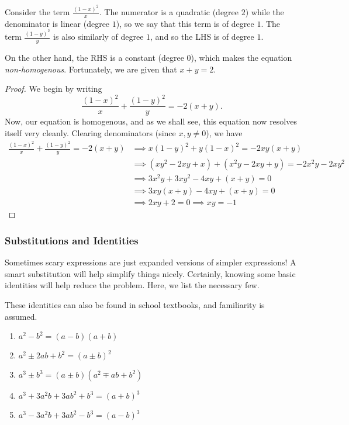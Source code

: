\documentclass[../jarvis.tex]{subfiles}
\begin{document}
Consider the term $\frac{(1-x)^2}{x}$. The numerator is a quadratic (degree $2$) while the denominator is linear (degree $1$), so we say that this term is of degree $1$. The term $\frac{(1-y)^2}{y}$ is also similarly of degree $1$, and so the LHS is of degree $1$. 

On the other hand, the RHS is a constant (degree $0$), which makes the equation \textit{non-homogenous}. Fortunately, we are given that $x+y=2$. 

\begin{proof}
    We begin by writing
$$\frac{(1-x)^2}{x}+\frac{(1-y)^2}{y}=-2(x+y).$$ Now, our equation is homogenous, and as we shall see, this equation now resolves itself very cleanly. Clearing denominators (since $x,y \neq 0$), we have
\begin{align*}
    \frac{(1-x)^2}{x}+\frac{(1-y)^2}{y}=-2(x+y) &\implies x(1-y)^2+y(1-x)^2=-2xy(x+y) \\
    &\implies (xy^2-2xy+x)+(x^2y-2xy+y)=-2x^2y-2xy^2 \\
    &\implies 3x^2y+3xy^2-4xy+(x+y)=0 \\
    &\implies 3xy(x+y)-4xy+(x+y)=0 \\
    &\implies 2xy+2=0 \implies xy=\boxed{-1}
\end{align*}
\end{proof}

\subsubsection{Substitutions and Identities}
Sometimes scary expressions are just expanded versions of simpler expressions! A smart substitution will help simplify things nicely. Certainly, knowing some basic identities will help reduce the problem. Here, we list the necessary few.

\begin{proposition}
    These identities can also be found in school textbooks, and familiarity is assumed.
    \begin{enumerate}
        \item $a^2-b^2=(a-b)(a+b)$
        \item $a^2\pm 2ab+b^2=(a\pm b)^2$
        \item $a^3\pm b^3=(a\pm b)(a^2\mp ab+b^2)$
        \item $a^3+3a^2b+3ab^2+b^3=(a+b)^3$
        \item $a^3-3a^2b+3ab^2-b^3=(a-b)^3$
    \end{enumerate}
\end{proposition}
\end{document}
